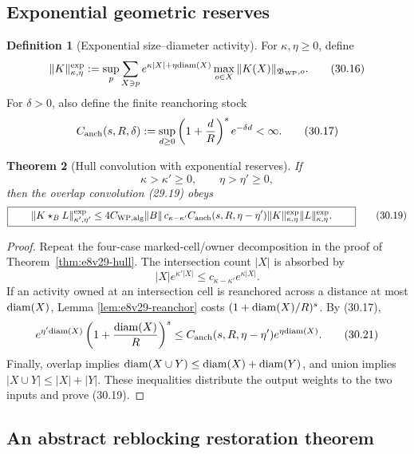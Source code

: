 \documentclass[11pt,oneside]{book}
\newtheorem{theorem}{Theorem}[chapter]
\theoremstyle{definition}
\newtheorem{definition}[theorem]{Definition}
\theoremstyle{remark}
\begin{document}
\subsection{Exponential geometric reserves}

\begin{definition}[Exponential size--diameter activity]
\label{def:e8v30-exp-activity}
For \(\kappa,\eta\geq0\), define
\[
 \|K\|_{\kappa,\eta}^{\exp}
 :=
 \sup_p\sum_{X\ni p}
 e^{\kappa|X|+\eta{\rm diam}(X)}
 \max_{o\in X}\|K(X)\|_{\mathfrak B_{\rm WP},o}.                  \tag{30.16}
\]
For \(\delta>0\), also define the finite reanchoring stock
\[
 C_{\rm anch}(s,R,\delta)
 :=
 \sup_{d\geq0}
 \left(1+\frac dR\right)^s e^{-\delta d}<\infty.                 \tag{30.17}
\]
\end{definition}

\begin{theorem}[Hull convolution with exponential reserves]
\label{thm:e8v30-exp-hull}
If
\[
             \kappa>\kappa'\geq0,\qquad
             \eta>\eta'\geq0,                                   \tag{30.18}
\]
then the overlap convolution (29.19) obeys
\[
\boxed{\qquad
 \|K\star_B L\|_{\kappa',\eta'}^{\exp}
 \leq
 4C_{\rm WP,alg}\|B\|\,
 c_{\kappa-\kappa'}
 C_{\rm anch}(s,R,\eta-\eta')
 \|K\|_{\kappa,\eta}^{\exp}
 \|L\|_{\kappa,\eta}^{\exp}.
\qquad}                                                           \tag{30.19}
\]
\end{theorem}

\begin{proof}
Repeat the four-case marked-cell/owner decomposition in the proof of
Theorem~\ref{thm:e8v29-hull}.  The intersection count \(|X|\) is
absorbed by
\[
 |X|e^{\kappa'|X|}
 \leq c_{\kappa-\kappa'}e^{\kappa|X|}.                           \tag{30.20}
\]
If an activity owned at an intersection cell is reanchored across a
distance at most \({\rm diam}(X)\), Lemma
\ref{lem:e8v29-reanchor} costs
\((1+{\rm diam}(X)/R)^s\).  By (30.17),
\[
 e^{\eta'{\rm diam}(X)}
 \left(1+\frac{{\rm diam}(X)}R\right)^s
 \leq
 C_{\rm anch}(s,R,\eta-\eta')
 e^{\eta{\rm diam}(X)}.                                         \tag{30.21}
\]
Finally, overlap implies
\({\rm diam}(X\cup Y)\leq{\rm diam}(X)+{\rm diam}(Y)\), and union
implies \(|X\cup Y|\leq|X|+|Y|\).  These inequalities distribute the
output weights to the two inputs and prove (30.19).
\end{proof}

\subsection{An abstract reblocking restoration theorem}
\end{document}
